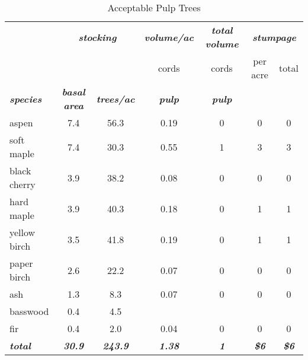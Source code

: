 \documentclass[landscape]{article}
\begin{document}
\begin{table}[H]

\caption{\label{tab:unnamed-chunk-42}Acceptable Pulp Trees}
\fontsize{10}{12}\selectfont
\begin{tabular}[t]{lcccccc}
\toprule
\multicolumn{1}{c}{\em{\textbf{ }}} & \multicolumn{2}{c}{\em{\textbf{stocking}}} & \multicolumn{1}{c}{\em{\textbf{volume/ac }}} & \multicolumn{1}{c}{\em{\textbf{total volume}}} & \multicolumn{2}{c}{\em{\textbf{stumpage}}} \\
\cmidrule(l{3pt}r{3pt}){2-3} \cmidrule(l{3pt}r{3pt}){4-4} \cmidrule(l{3pt}r{3pt}){5-5} \cmidrule(l{3pt}r{3pt}){6-7}
\multicolumn{3}{c}{ } & \multicolumn{1}{c}{cords} & \multicolumn{1}{c}{cords} & \multicolumn{1}{c}{per acre} & \multicolumn{1}{c}{total} \\
\cmidrule(l{3pt}r{3pt}){4-4} \cmidrule(l{3pt}r{3pt}){5-5} \cmidrule(l{3pt}r{3pt}){6-6} \cmidrule(l{3pt}r{3pt}){7-7}
\rowcolor[HTML]{DCDCDC}  \em{\textbf{species}} & \em{\textbf{basal area}} & \em{\textbf{trees/ac}} & \em{\textbf{pulp}} & \em{\textbf{pulp}} & \em{\textbf{ }} & \em{\textbf{ }}\\
\midrule
\rowcolor{gray!6}  aspen & 7.4 & 56.3 & 0.19 & 0 & 0 & 0\\
 
soft maple & 7.4 & 30.3 & 0.55 & 1 & 3 & 3\\
 
\rowcolor{gray!6}  black cherry & 3.9 & 38.2 & 0.08 & 0 & 0 & 0\\
 
hard maple & 3.9 & 40.3 & 0.18 & 0 & 1 & 1\\
 
\rowcolor{gray!6}  yellow birch & 3.5 & 41.8 & 0.19 & 0 & 1 & 1\\
 
paper birch & 2.6 & 22.2 & 0.07 & 0 & 0 & 0\\
 
\rowcolor{gray!6}  ash & 1.3 & 8.3 & 0.07 & 0 & 0 & 0\\
 
basswood & 0.4 & 4.5 &  &  &  & \\
 
\rowcolor{gray!6}  fir & 0.4 & 2.0 & 0.04 & 0 & 0 & 0\\
 
\rowcolor[HTML]{DCDCDC}  \em{\textbf{total}} & \em{\textbf{30.9}} & \em{\textbf{243.9}} & \em{\textbf{1.38}} & \em{\textbf{1}} & \em{\textbf{\$6}} & \em{\textbf{\$6}}\\
\bottomrule
\end{tabular}
\end{table}
\end{document}
